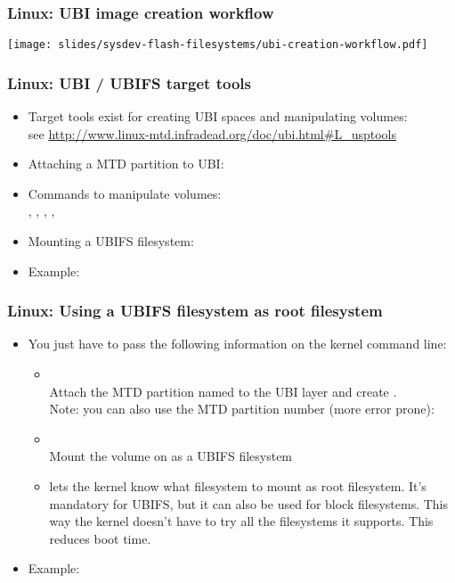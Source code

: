\begin{frame}
  \frametitle{Linux: UBI image creation workflow}
  \begin{center}
    \texttt{[image: slides/sysdev-flash-filesystems/ubi-creation-workflow.pdf]}
  \end{center}
\end{frame}

\begin{frame}
  \frametitle{Linux: UBI / UBIFS target tools}
  \begin{itemize}
  \item Target tools exist for creating UBI spaces and manipulating volumes:\\
    see \url{http://www.linux-mtd.infradead.org/doc/ubi.html\#L_usptools}
  \item Attaching a MTD partition to UBI:\\
  \item Commands to manipulate volumes:\\ ,
    , , ,
  \item Mounting a UBIFS filesystem:\\
  \item Example:\\
  \end{itemize}
\end{frame}

\begin{frame}
  \frametitle{Linux: Using a UBIFS filesystem as root filesystem}
  \begin{itemize}
  \item You just have to pass the following information on the kernel
    command line:
    \begin{itemize}
    \item {}\\
      Attach the MTD partition named  to the UBI layer and
      create .\\
      Note: you can also use the MTD partition number (more error
      prone): 
    \item {}\\
      Mount the  volume on  as a UBIFS filesystem
    \item {} lets the kernel know what filesystem
      to mount as root filesystem. It's mandatory for UBIFS, but
      it can also be used for block filesystems. This way the kernel
      doesn't have to try all the filesystems it supports. This reduces
      boot time.
    \end{itemize}
  \item Example: 
  \end{itemize}
\end{frame}

